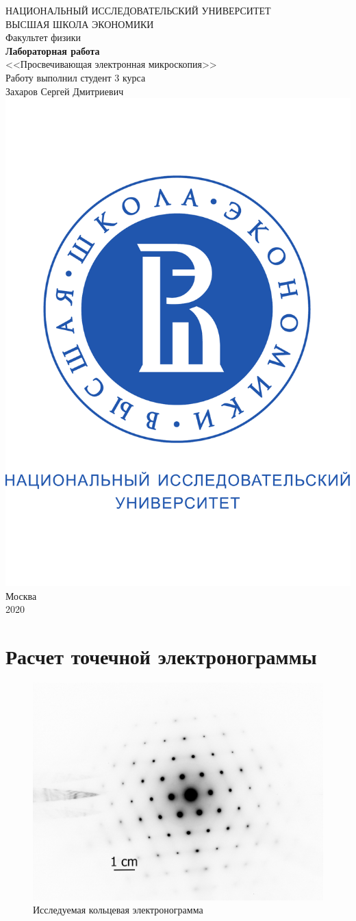 \documentclass[a4paper, 12pt]{article}
\begin{document}
	\begin{titlepage}
		\begin{center}
			$$$$
			$$$$
			$$$$
			$$$$
			{\Large{НАЦИОНАЛЬНЫЙ ИССЛЕДОВАТЕЛЬСКИЙ УНИВЕРСИТЕТ}}\\
			\vspace{0.1cm}
			{\Large{ВЫСШАЯ ШКОЛА ЭКОНОМИКИ}}\\
			\vspace{0.25cm}
			{\large{Факультет физики}}\\
			\vspace{4cm}
			{\Huge\textbf{{Лабораторная работа}}}\\%
			\vspace{1cm}
			{\LARGE{<<Просвечивающая электронная микроскопия>>}}\\%
			\vspace{2cm}
			{Работу выполнил студент 3 курса}\\
			{Захаров Сергей Дмитриевич}
			\vfill
			\includegraphics[width=0.2\linewidth]{HSElogo}
			\vfill
			Москва\\
			2020
		\end{center}
	\end{titlepage}

\tableofcontents

\newpage

\section{Расчет точечной электронограммы}

\begin{figure}[H]
	\centering
	\includegraphics[width=0.7\linewidth, angle=90]{T2}
	\caption{Исследуемая кольцевая электронограмма}
	\label{fig:dots}
\end{figure}
\end{document}
